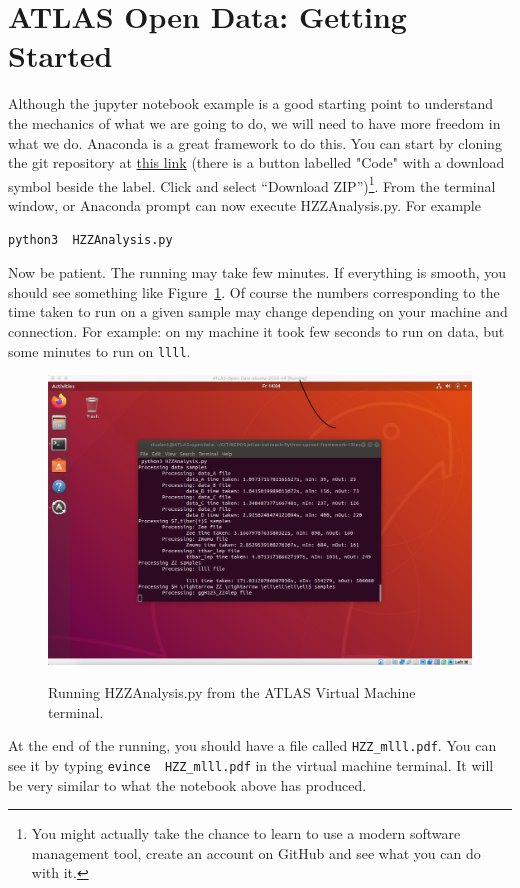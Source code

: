 \section{ATLAS Open Data: Getting Started} 


Although the jupyter notebook example is a good starting point to understand the mechanics of what we are going to do, we will need to have more freedom in what we do. Anaconda is a great framework to do this. You can start by cloning the git repository at \href{https://github.com/atlas-outreach-data-tools/atlas-outreach-Python-uproot-framework-13tev}{this link} (there is a button labelled "Code" with a download symbol beside the label. Click and select ``Download ZIP'')\footnote{You might actually take the chance to learn to use a modern software management tool, create an account on GitHub and see what you can do with it.}. From the terminal window, or Anaconda prompt can now execute HZZAnalysis.py. For example

\begin{verbatim}
python3  HZZAnalysis.py
\end{verbatim}

Now be patient. The running may take few minutes. If everything is smooth, you should see something like Figure~\ref{fig:running_HZZ}. Of course the numbers corresponding to the time taken to run on a given sample may change depending on your machine and connection. For example: on my machine it took few seconds to run on data, but some minutes to run on \verb|llll|. 

\begin{figure}[tb] 
	\centering
	\includegraphics[width=0.7\columnwidth]{Figures/Running_HZZ.png}
	\label{fig:running_HZZ}
	\caption{Running HZZAnalysis.py from the ATLAS Virtual Machine terminal.}
\end{figure}

At the end of the running, you should have a file called \verb|HZZ_mlll.pdf|. You can see it by typing \verb|evince  HZZ_mlll.pdf| in the virtual machine terminal. It will be very similar to what the notebook above has produced. 

